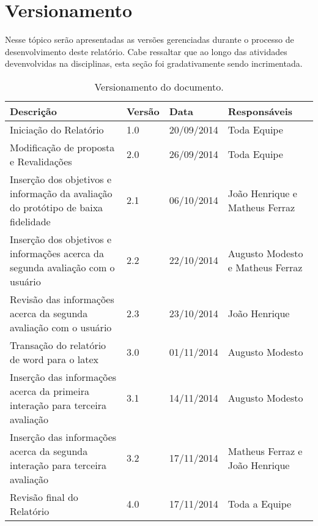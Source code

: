\chapter[Versionamento]{Versionamento}
\label{chap:versionamento}
	Nesse tópico serão apresentadas as versões gerenciadas durante o processo de desenvolvimento deste relatório. Cabe ressaltar que ao longo das atividades devenvolvidas na disciplinas, esta seção foi gradativamente sendo incrimentada.
	
	\label{subsubsec:versionamento_talbe}
		\begin{table}[h]
			\centering
			\begin{tabular}{|p{5cm}|p{1.5cm}|p{2.5cm}|p{5cm}|}
				\hline
				
				Descrição & Versão & Data & Responsáveis \\ \hline
				
				Iniciação do Relatório & 1.0 & 20/09/2014 & Toda Equipe \\ \hline
				
				Modificação de proposta e Revalidações & 2.0 & 26/09/2014 & Toda Equipe \\ \hline
				
				Inserção dos objetivos e informação da avaliação do protótipo de baixa fidelidade & 2.1 & 06/10/2014 & João Henrique e Matheus Ferraz \\ \hline

				Inserção dos objetivos e informações acerca da segunda avaliação com o usuário & 2.2 & 22/10/2014 & Augusto Modesto e Matheus Ferraz \\ \hline

				Revisão das informações acerca da segunda avaliação com o usuário & 2.3 & 23/10/2014 & João Henrique \\ \hline

				Transação do relatório de word para o latex & 3.0 & 01/11/2014 & Augusto Modesto \\ \hline

				Inserção das informações acerca da primeira interação para terceira avaliação & 3.1 & 14/11/2014 & Augusto Modesto \\ \hline

				Inserção das informações acerca da segunda interação para terceira avaliação & 3.2 & 17/11/2014 & Matheus Ferraz e João Henrique \\ \hline

				Revisão final do Relatório & 4.0 & 17/11/2014 & Toda a Equipe \\ \hline

			\end{tabular}
			\caption[Versionamento do Documento]{Versionamento do documento.}
			\label{tab:versionamento_tabl}
		\end{table}
